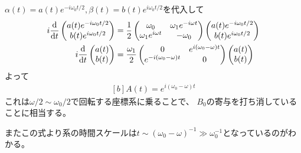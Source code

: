\documentclass[../ap_2022.tex]{subfiles}
\begin{document}
\subsection{}
\(\alpha(t)=a(t)e^{-i\omega_0t/2},\beta(t)=b(t)e^{i\omega_0t/2}\)を代入して
\begin{equation}\begin{aligned}[b]
    i\dv{t}\begin{pmatrix}
        a(t)e^{-i\omega_0t/2}\\
        b(t)e^{i\omega_0t/2}
    \end{pmatrix}
    &=\frac{1}{2}\begin{pmatrix}
        \omega_0 & \omega_1 e^{-i\omega t}\\
        \omega_1 e^{i\omega t} & -\omega_0
    \end{pmatrix}\begin{pmatrix}
        a(t)e^{-i\omega_0t/2}\\
        b(t)e^{i\omega_0t/2}
    \end{pmatrix}\\
    i\dv{t}\begin{pmatrix}
        a(t)\\
        b(t)
    \end{pmatrix}
    &=\frac{\omega_1}{2}\begin{pmatrix}
        0 & e^{i(\omega_0-\omega) t}\\
         e^{-i(\omega_0-\omega) t} & 0
    \end{pmatrix}\begin{pmatrix}
        a(t)\\
        b(t)
    \end{pmatrix}
\end{aligned}\end{equation}
よって
\begin{equation}\begin{aligned}[b]
    A(t) = e^{i(\omega_0-\omega) t}
\end{aligned}\end{equation}
これは\(\omega/2\sim\omega_0/2\)で回転する座標系に乗ることで、
\(B_0\)の寄与を打ち消していることに相当する。

またこの式より系の時間スケールは\(t\sim(\omega_0-\omega)^{-1}\gg \omega_0^{-1}\)となっているのがわかる。

\section{}
\end{document}
